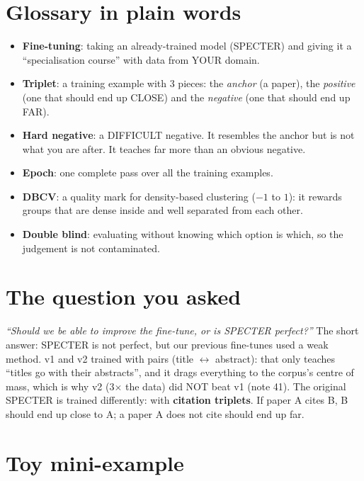 \documentclass[11pt,a4paper]{article}
\begin{document}

\section{Glossary in plain words}

\begin{itemize}
  \item \textbf{Fine-tuning}: taking an already-trained model (SPECTER) and giving it a
        ``specialisation course'' with data from YOUR domain.
  \item \textbf{Triplet}: a training example with 3 pieces: the \emph{anchor} (a paper), the
        \emph{positive} (one that should end up CLOSE) and the \emph{negative} (one that should
        end up FAR).
  \item \textbf{Hard negative}: a DIFFICULT negative. It resembles the anchor but is not what
        you are after. It teaches far more than an obvious negative.
  \item \textbf{Epoch}: one complete pass over all the training examples.
  \item \textbf{DBCV}: a quality mark for density-based clustering ($-1$ to $1$): it rewards
        groups that are dense inside and well separated from each other.
  \item \textbf{Double blind}: evaluating without knowing which option is which, so the
        judgement is not contaminated.
\end{itemize}

\section{The question you asked}

\emph{``Should we be able to improve the fine-tune, or is SPECTER perfect?''} The short answer:
SPECTER is not perfect, but our previous fine-tunes used a weak method. v1 and v2 trained with
pairs (title $\leftrightarrow$ abstract): that only teaches ``titles go with their abstracts'',
and it drags everything to the corpus's centre of mass, which is why v2 (3$\times$ the data)
did NOT beat v1 (note 41). The original SPECTER is trained differently: with \textbf{citation
triplets}. If paper A cites B, B should end up close to A; a paper A does not cite should end
up far.

\section{Toy mini-example}
\end{document}
